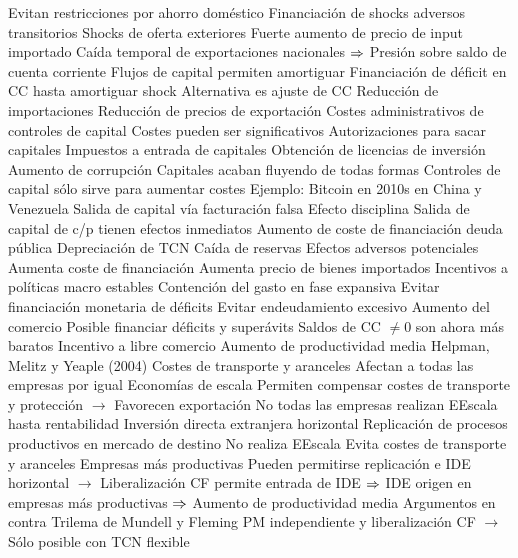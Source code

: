 \documentclass{nuevotema}
\begin{document}
\begin{esquemal}
				\4[] Evitan restricciones por ahorro doméstico
			\3 Financiación de shocks adversos transitorios
				\4 Shocks de oferta exteriores
				\4[] Fuerte aumento de precio de input importado
				\4[] Caída temporal de exportaciones nacionales
				\4[] $\then$ Presión sobre saldo de cuenta corriente
				\4 Flujos de capital permiten amortiguar
				\4[] Financiación de déficit en CC hasta amortiguar shock
				\4 Alternativa es ajuste de CC
				\4[] Reducción de importaciones
				\4[] Reducción de precios de exportación
			\3 Costes administrativos de controles de capital
				\4 Costes pueden ser significativos
				\4 Autorizaciones para sacar capitales
				\4 Impuestos a entrada de capitales
				\4 Obtención de licencias de inversión
				\4 Aumento de corrupción
				\4 Capitales acaban fluyendo de todas formas
				\4 Controles de capital sólo sirve para aumentar costes
				\4 Ejemplo:
				\4[] Bitcoin en 2010s en China y Venezuela
				\4[] Salida de capital vía facturación falsa
			\3 Efecto disciplina
				\4 Salida de capital de c/p tienen efectos inmediatos
				\4[] Aumento de coste de financiación deuda pública
				\4[] Depreciación de TCN
				\4[] Caída de reservas
				\4 Efectos adversos potenciales
				\4[] Aumenta coste de financiación
				\4[] Aumenta precio de bienes importados
				\4[$\then$] Incentivos a políticas macro estables
				\4[] Contención del gasto en fase expansiva
				\4[] Evitar financiación monetaria de déficits
				\4[] Evitar endeudamiento excesivo
			\3 Aumento del comercio
				\4 Posible financiar déficits y superávits
				\4 Saldos de CC $\neq 0$ son ahora más baratos
				\4[$\then$] Incentivo a libre comercio
			\3 Aumento de productividad media
				\4 Helpman, Melitz y Yeaple (2004)
				\4 Costes de transporte y aranceles
				\4[] Afectan a todas las empresas por igual
				\4 Economías de escala
				\4[] Permiten compensar costes de transporte y protección
				\4[] $\to$ Favorecen exportación
				\4[] No todas las empresas realizan EEscala hasta rentabilidad
				\4 Inversión directa extranjera horizontal
				\4[] Replicación de procesos productivos en mercado de destino
				\4[] No realiza EEscala
				\4[] Evita costes de transporte y aranceles
				\4 Empresas más productivas
				\4[] Pueden permitirse replicación e IDE horizontal
				\4[] $\to$ Liberalización CF permite entrada de IDE
				\4[] $\then$ IDE origen en empresas más productivas
				\4[] $\then$ Aumento de productividad media
		\2 Argumentos en contra
			\3 Trilema de Mundell y Fleming
				\4 PM independiente y liberalización CF
				\4[] $\to$ Sólo posible con TCN flexible

\end{esquemal}
\end{document}
